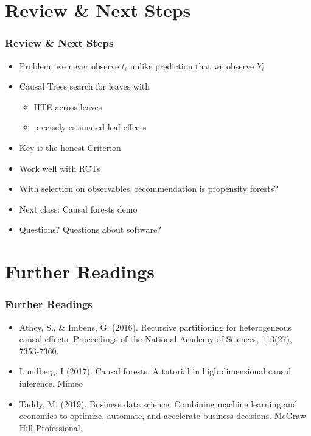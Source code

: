 \documentclass[
  shownotes,
  xcolor={svgnames},
  hyperref={colorlinks,citecolor=DarkBlue,linkcolor=DarkRed,urlcolor=DarkBlue}
  , aspectratio=169]{beamer}
\begin{document}
\section{Review
 \& Next Steps}
\begin{frame}
\frametitle{Review \& Next Steps}
  
\begin{itemize} 
    \item Problem: we never observe $t_i$ unlike prediction that we observe $Y_i$
    \medskip
    \item Causal Trees search for leaves with
    \begin{itemize}
      \item HTE across leaves
      \item precisely-estimated leaf effects
    \end{itemize}
    \item Key is the honest Criterion
    \medskip
    \item Work well with RCTs
    \medskip
    \item  With selection on observables, recommendation is propensity forests?
    \medskip  
    \item  Next class:  Causal forests demo
    \medskip  
    \item Questions? Questions about software? 

\end{itemize}
\end{frame}
\section{Further Readings}
\begin{frame}
\frametitle{Further Readings}

\begin{itemize}

  \item Athey, S., \& Imbens, G. (2016). Recursive partitioning for heterogeneous causal effects. Proceedings of the National Academy of Sciences, 113(27), 7353-7360.
  \medskip
  \item Lundberg, I (2017). Causal forests. A tutorial in high dimensional causal inference. Mimeo
  \medskip
  \item Taddy, M. (2019). Business data science: Combining machine learning and economics to optimize, automate, and accelerate business decisions. McGraw Hill Professional.
  

  
\end{itemize}

\end{frame}





\end{document}
